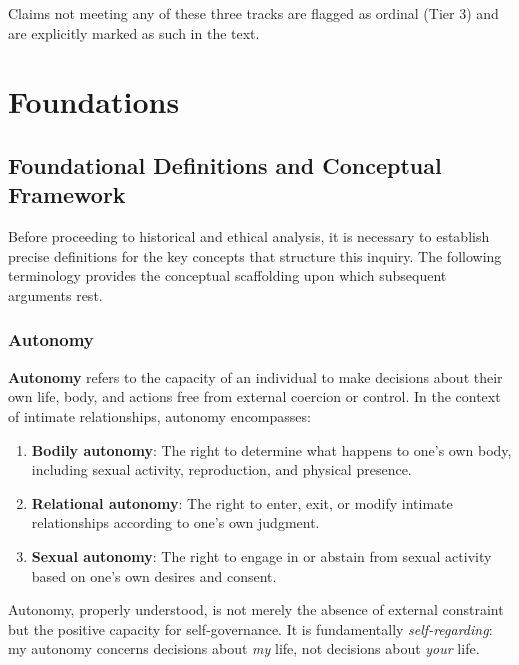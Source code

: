 \documentclass[12pt,openany]{book}
\numberwithin{equation}{chapter}
\begin{document}
Claims not meeting any of these three tracks are flagged as ordinal (Tier 3) and are explicitly marked as such in the text.

\newpage
\tableofcontents
\newpage
\listoffigures
\newpage

\mainmatter

\part{Foundations}

\chapter{Foundational Definitions and Conceptual Framework}

Before proceeding to historical and ethical analysis, it is necessary to establish precise definitions for the key concepts that structure this inquiry. The following terminology provides the conceptual scaffolding upon which subsequent arguments rest.

\section{Autonomy}

\textbf{Autonomy} refers to the capacity of an individual to make decisions about their own life, body, and actions free from external coercion or control. In the context of intimate relationships, autonomy encompasses:

\begin{enumerate}[label=(\alph*)]
    \item \textbf{Bodily autonomy}: The right to determine what happens to one's own body, including sexual activity, reproduction, and physical presence.
    \item \textbf{Relational autonomy}: The right to enter, exit, or modify intimate relationships according to one's own judgment.
    \item \textbf{Sexual autonomy}: The right to engage in or abstain from sexual activity based on one's own desires and consent.
\end{enumerate}

Autonomy, properly understood, is not merely the absence of external constraint but the positive capacity for self-governance. It is fundamentally \textit{self-regarding}: my autonomy concerns decisions about \textit{my} life, not decisions about \textit{your} life.
\end{document}
